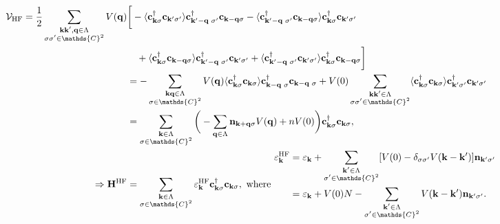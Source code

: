 \begin{equation}
\begin{split}
    \mathcal{V}_{\textnormal{HF}} = \frac{1}{2} \sum_{\substack{{\bf k}{\bf k}',{\bf q} \in \Lambda\\
    \sigma \sigma' \in \mathds{C}^2}} V({\bf q}) &\bigg[-\langle 
    {\bf c}_{{\bf k}\sigma}^\dagger {\bf c}_{{\bf k}'\sigma'}
    \rangle {\bf c}_{{\bf k}'-{\bf q} \blanky \sigma'}^\dagger {\bf c}_{{\bf k}-{\bf q} \sigma} 
    -  \langle {\bf c}_{{\bf k}'-{\bf q} \blanky \sigma'}^\dagger {\bf c}_{{\bf k}-{\bf q} \sigma}  \rangle {\bf c}_{{\bf k}\sigma}^\dagger {\bf c}_{{\bf k}'\sigma'} \\
    & \blanky \blanky \blanky + \langle {\bf c}_{{\bf k}\sigma}^\dagger {\bf c}_{{\bf k}-{\bf q} \sigma} \rangle {\bf c}_{{\bf k}'-{\bf q} \blanky \sigma'}^\dagger {\bf c}_{{\bf k}'\sigma'}
    +  \langle {\bf c}_{{\bf k}'-{\bf q} \blanky \sigma'}^\dagger {\bf c}_{{\bf k}'\sigma'} \rangle {\bf c}_{{\bf k}\sigma}^\dagger {\bf c}_{{\bf k}-{\bf q} \sigma} 
    \bigg] \\
    &= - \sum_{\substack{{\bf k}{\bf q} \in \Lambda\\
    \sigma \in \mathds{C}^2}} V({\bf q})  \langle {\bf c}_{{\bf k} \sigma}^\dagger {\bf c}_{{\bf k} \sigma} \rangle {\bf c}_{{\bf k}-{\bf q} \blanky \sigma}^\dagger {\bf c}_{{\bf k}-{\bf q} \blanky \sigma} + V(0) \sum_{\substack{{\bf k}{\bf k}' \in \Lambda\\
    \sigma \sigma' \in \mathds{C}^2}} \langle {\bf c}_{{\bf k} \sigma}^\dagger {\bf c}_{{\bf k} \sigma} \rangle  {\bf c}_{{\bf k}' \sigma'}^\dagger {\bf c}_{{\bf k}' \sigma'} \\
    &= \sum_{\substack{{\bf k} \in \Lambda\\
    \sigma \in \mathds{C}^2}} \bigg(-\sum_{{\bf q} \in \Lambda} {\bf n}_{{\bf k}+{\bf q} \sigma} V({\bf q}) + nV(0)\bigg){\bf c}_{{\bf k} \sigma}^\dagger {\bf c}_{{\bf k} \sigma}, \\
    \Rightarrow  {\bf H}^{\textnormal{HF}} &= \sum_{\substack{{\bf k} \in \Lambda\\
    \sigma \in \mathds{C}^2}} \varepsilon_{\bf k}^{\textnormal{HF}} {\bf c}_{{\bf k} \sigma}^\dagger {\bf c}_{{\bf k} \sigma}, \textnormal{ where } \begin{split}
        \varepsilon_{\bf k}^{\textnormal{HF}} &= \varepsilon_{\bf k} + \sum_{\substack{{\bf k}' \in \Lambda\\
    \sigma' \in \mathds{C}^2}} [V(0) - \delta_{\sigma\sigma'} V({\bf k}- {\bf k}')] {\bf n}_{{\bf k}' \sigma'} \\
        &= \varepsilon_{\bf k} + V(0) N - \sum_{\substack{{\bf k}' \in \Lambda\\
    \sigma' \in \mathds{C}^2}} V({\bf k}- {\bf k}') {\bf n}_{{\bf k'} \sigma'}.
    \end{split}
    \end{split}
\end{equation}

